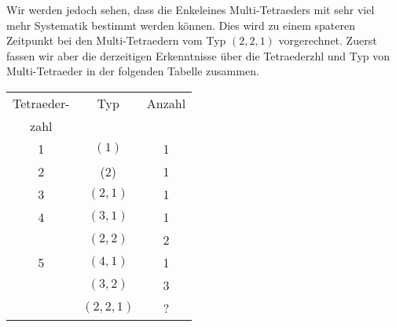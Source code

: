 \documentclass[12pt,titlepage,twoside,cleardoublepage]{article}
\theoremstyle{nummermitklammern}
\numberwithin{equation}{section}
\begin{document}
 Wir werden jedoch sehen, dass die Enkeleines Multi-Tetraeders mit sehr viel mehr Systematik bestimmt werden können. Dies wird zu einem spateren Zeitpunkt bei den Multi-Tetraedern vom Typ $(2,2,1)$ vorgerechnet. Zuerst fassen wir aber die derzeitigen Erkenntnisse über die Tetraederzhl und Typ von Multi-Tetraeder in der folgenden Tabelle zusammen. 
\begin{center}
\begin{tabular}{|c|c|c|}
\hline
Tetraeder- & Typ & Anzahl\\
zahl& &\\
\hline
1 &$(1)$ &1 \\
\hline
2 &(2) &1\\
\hline
3 &$(2,1)$ &1\\
\hline
4 &$(3,1)$ & 1 \\
 & $(2,2)$& 2\\
\hline
5 & $(4,1)$& 1\\
 &$(3,2)$ & 3\\
 & $(2,2,1)$& ?\\
\hline
\end{tabular}
\end{center}
\end{document}
